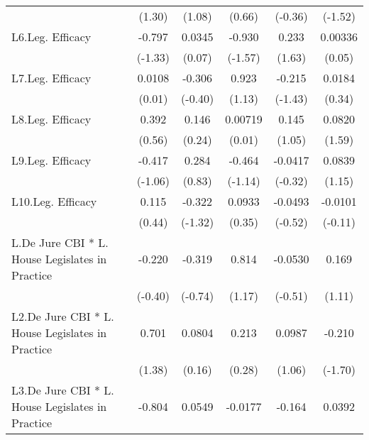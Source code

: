 {\begin{longtable}{l*{5}{c}}
                &   (1.30)         &   (1.08)         &   (0.66)         &  (-0.36)         &  (-1.52)         \\
[1em]
L6.Leg. Efficacy&   -0.797         &   0.0345         &   -0.930         &    0.233         &  0.00336         \\
                &  (-1.33)         &   (0.07)         &  (-1.57)         &   (1.63)         &   (0.05)         \\
[1em]
L7.Leg. Efficacy&   0.0108         &   -0.306         &    0.923         &   -0.215         &   0.0184         \\
                &   (0.01)         &  (-0.40)         &   (1.13)         &  (-1.43)         &   (0.34)         \\
[1em]
L8.Leg. Efficacy&    0.392         &    0.146         &  0.00719         &    0.145         &   0.0820         \\
                &   (0.56)         &   (0.24)         &   (0.01)         &   (1.05)         &   (1.59)         \\
[1em]
L9.Leg. Efficacy&   -0.417         &    0.284         &   -0.464         &  -0.0417         &   0.0839         \\
                &  (-1.06)         &   (0.83)         &  (-1.14)         &  (-0.32)         &   (1.15)         \\
[1em]
L10.Leg. Efficacy&    0.115         &   -0.322         &   0.0933         &  -0.0493         &  -0.0101         \\
                &   (0.44)         &  (-1.32)         &   (0.35)         &  (-0.52)         &  (-0.11)         \\
[1em]
L.De Jure CBI * L. House Legislates in Practice&   -0.220         &   -0.319         &    0.814         &  -0.0530         &    0.169         \\
                &  (-0.40)         &  (-0.74)         &   (1.17)         &  (-0.51)         &   (1.11)         \\
[1em]
L2.De Jure CBI * L. House Legislates in Practice&    0.701         &   0.0804         &    0.213         &   0.0987         &   -0.210         \\
                &   (1.38)         &   (0.16)         &   (0.28)         &   (1.06)         &  (-1.70)         \\
[1em]
L3.De Jure CBI * L. House Legislates in Practice&   -0.804         &   0.0549         &  -0.0177         &   -0.164         &   0.0392         \\

\end{longtable}}
